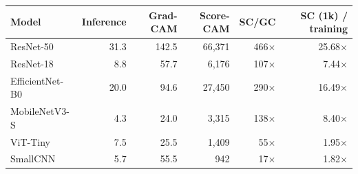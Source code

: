 \begin{tabular}{lrrrrr}
\toprule
Model & Inference & Grad-CAM & Score-CAM & SC/GC & SC (1k) / training \\
\midrule
ResNet-50 & 31.3 & 142.5 & 66{,}371 & 466$\times$ & 25.68$\times$ \\
ResNet-18 & 8.8 & 57.7 & 6{,}176 & 107$\times$ & 7.44$\times$ \\
EfficientNet-B0 & 20.0 & 94.6 & 27{,}450 & 290$\times$ & 16.49$\times$ \\
MobileNetV3-S & 4.3 & 24.0 & 3{,}315 & 138$\times$ & 8.40$\times$ \\
ViT-Tiny & 7.5 & 25.5 & 1{,}409 & 55$\times$ & 1.95$\times$ \\
SmallCNN & 5.7 & 55.5 & 942 & 17$\times$ & 1.82$\times$ \\
\bottomrule
\end{tabular}